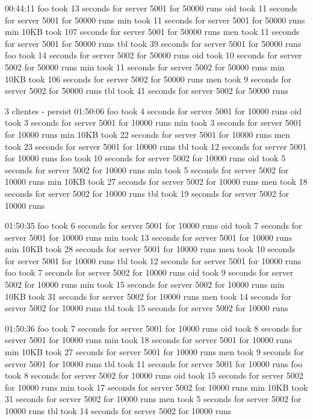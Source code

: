 \documentclass[11pt]{article}
\begin{document}
00:44:11
foo took 13 seconds for server 5001 for 50000 runs
oid took 11 seconds for server 5001 for 50000 runs
min took 11 seconds for server 5001 for 50000 runs
min 10KB took 107 seconds for server 5001 for 50000 runs
men took 11 seconds for server 5001 for 50000 runs
tbl took 39 seconds for server 5001 for 50000 runs
foo took 14 seconds for server 5002 for 50000 runs
oid took 10 seconds for server 5002 for 50000 runs
min took 11 seconds for server 5002 for 50000 runs
min 10KB took 106 seconds for server 5002 for 50000 runs
men took 9 seconds for server 5002 for 50000 runs
tbl took 41 seconds for server 5002 for 50000 runs


 3 clientes - persist
01:50:06
foo took 4 seconds for server 5001 for 10000 runs
oid took 3 seconds for server 5001 for 10000 runs
min took 3 seconds for server 5001 for 10000 runs
min 10KB took 22 seconds for server 5001 for 10000 runs
men took 23 seconds for server 5001 for 10000 runs
tbl took 12 seconds for server 5001 for 10000 runs
foo took 10 seconds for server 5002 for 10000 runs
oid took 5 seconds for server 5002 for 10000 runs
min took 5 seconds for server 5002 for 10000 runs
min 10KB took 27 seconds for server 5002 for 10000 runs
men took 18 seconds for server 5002 for 10000 runs
tbl took 19 seconds for server 5002 for 10000 runs

01:50:35
foo took 6 seconds for server 5001 for 10000 runs
oid took 7 seconds for server 5001 for 10000 runs
min took 13 seconds for server 5001 for 10000 runs
min 10KB took 28 seconds for server 5001 for 10000 runs
men took 10 seconds for server 5001 for 10000 runs
tbl took 12 seconds for server 5001 for 10000 runs
foo took 7 seconds for server 5002 for 10000 runs
oid took 9 seconds for server 5002 for 10000 runs
min took 15 seconds for server 5002 for 10000 runs
min 10KB took 31 seconds for server 5002 for 10000 runs
men took 14 seconds for server 5002 for 10000 runs
tbl took 15 seconds for server 5002 for 10000 runs

01:50:36
foo took 7 seconds for server 5001 for 10000 runs
oid took 8 seconds for server 5001 for 10000 runs
min took 18 seconds for server 5001 for 10000 runs
min 10KB took 27 seconds for server 5001 for 10000 runs
men took 9 seconds for server 5001 for 10000 runs
tbl took 11 seconds for server 5001 for 10000 runs
foo took 8 seconds for server 5002 for 10000 runs
oid took 15 seconds for server 5002 for 10000 runs
min took 17 seconds for server 5002 for 10000 runs
min 10KB took 31 seconds for server 5002 for 10000 runs
men took 5 seconds for server 5002 for 10000 runs
tbl took 14 seconds for server 5002 for 10000 runs
\end{document}
